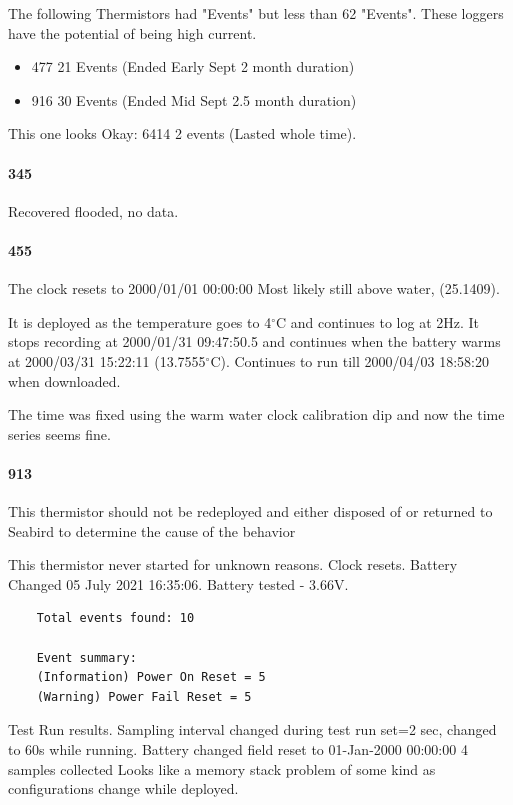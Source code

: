 \documentclass[10pt,letterpaper]{article}
\begin{document}
The following Thermistors had "Events" but less than 62 "Events".
These loggers have the potential of being high current.
\begin{itemize}
    \item 477 21 Events (Ended Early Sept 2 month duration)
    \item 916 30 Events (Ended Mid Sept 2.5 month duration)
\end{itemize}

This one looks Okay:
6414 2 events (Lasted whole time).

\paragraph{345}
Recovered flooded, no data.

\paragraph{455}
The clock resets to 2000/01/01 00:00:00 Most likely still
above water, (25.1409).

It is deployed as the temperature goes to 4$^{\circ}$C  and continues to log at 2Hz.
It stops recording at 2000/01/31 09:47:50.5 and continues when the battery warms
at 2000/03/31 15:22:11 (13.7555$^{\circ}$C).
Continues to run till 2000/04/03 18:58:20 when downloaded.

The time was fixed using the warm water clock calibration dip and now the time series seems fine.

\paragraph{913}
This thermistor should not be redeployed and either disposed of or returned to
Seabird to determine the cause of the behavior

This thermistor never started for unknown reasons.
Clock resets.
Battery Changed 05 July 2021 16:35:06.
Battery tested - 3.66V.

\begin{verbatim}
	Total events found: 10

	Event summary:
	(Information) Power On Reset = 5
	(Warning) Power Fail Reset = 5
\end{verbatim}

Test Run results.
Sampling interval changed during test run set=2 sec, changed to 60s while running.
Battery changed field reset to 01-Jan-2000 00:00:00
4 samples collected
Looks like a memory stack problem of some kind as configurations change while deployed.
\end{document}
